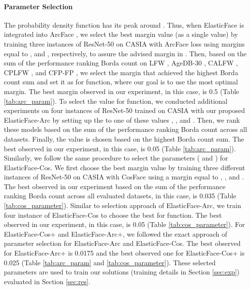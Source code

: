 \documentclass[letterpaper, 10 pt, conference]{ieeeconf}  \usepackage{times}
\begin{document}
\paragraph{Parameter Selection}
The probability density function has its peak around  \cite{peebles1987probability}. 
Thus, when ElasticFace is integrated into ArcFace \cite{deng2019arcface}, we select the best margin value (as a single value) by training three instances of  ResNet-50 \cite{DBLP:conf/cvpr/HeZRS16} on CASIA \cite{DBLP:journals/corr/YiLLL14a} with ArcFace loss using margins equal to ,  and , respectively, to assure the advised margin in \cite{deng2019arcface}.
Then, based on the sum of the performance ranking Borda count on LFW \cite{LFWTech}, AgeDB-30  \cite{DBLP:conf/cvpr/MoschoglouPSDKZ17}, CALFW \cite{DBLP:journals/corr/abs-1708-08197}, CPLFW \cite{CPLFWTech}, and CFP-FP \cite{DBLP:conf/wacv/SenguptaCCPCJ16}, we select the margin that achieved the highest Borda count sum and set it as  for  function, where our goal is to use the most optimal margin. 
The best margin observed in our experiment, in this case, is 0.5 (Table \ref{tab:arc_param}). 
To select the  value for  function, we conducted additional experiments on four instances of ResNet-50 trained on CASIA \cite{DBLP:journals/corr/YiLLL14a} with our proposed ElasticFace-Arc by setting up the  to one of these values , ,  and . 
Then, we rank these models based on the sum of the performance ranking Borda count across all datasets.
Finally, the  value is chosen based on the highest Borda count sum.  
The best  observed in our experiment, in this case, is 0.05 (Table \ref{tab:arc_param}). 
Similarly, we follow the same procedure to select the parameters ( and ) for ElasticFace-Cos.
We first choose the best margin value by training three different instances of ResNet-50 on CASIA \cite{DBLP:journals/corr/YiLLL14a} with CosFace using a margin equal to , , and . 
The best  observed in our experiment based on the sum of the performance ranking Borda count across all evaluated datasets, in this case, is 0.035 (Table \ref{tab:cos_parameter}). 
Similar to  selection approach of ElasticFace-Arc, we train four instance of ElasticFace-Cos to choose the best  for  function. The best observed  in our experiment, in this case, is 0.05 (Table \ref{tab:cos_parameter}).
For ElasticFace-Cos+ and ElasticFace-Arc+, we followed the exact approach of parameter selection for ElasticFace-Arc and ElasticFace-Cos. The best observed  for ElasticFace-Arc+ is 0.0175 and the best observed one for ElasticFace-Cos+ is 0.025 (Table \ref{tab:arc_param} and \ref{tab:cos_parameter}).
These selected parameters are used to train our solutions (training details in Section \ref{sec:exp}) evaluated in Section \ref{sec:res}.
\end{document}
